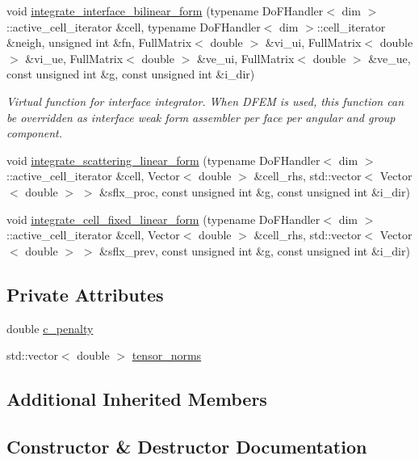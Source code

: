\begin{DoxyCompactItemize}
void \hyperlink{class_even_parity_a0a6674c14f34f22c8ff383aee81ffabf}{integrate\+\_\+interface\+\_\+bilinear\+\_\+form} (typename Do\+F\+Handler$<$ dim $>$\+::active\+\_\+cell\+\_\+iterator \&cell, typename Do\+F\+Handler$<$ dim $>$\+::cell\+\_\+iterator \&neigh, unsigned int \&fn, Full\+Matrix$<$ double $>$ \&vi\+\_\+ui, Full\+Matrix$<$ double $>$ \&vi\+\_\+ue, Full\+Matrix$<$ double $>$ \&ve\+\_\+ui, Full\+Matrix$<$ double $>$ \&ve\+\_\+ue, const unsigned int \&g, const unsigned int \&i\+\_\+dir)
\begin{DoxyCompactList}\small\item\em Virtual function for interface integrator. When D\+F\+EM is used, this function can be overridden as interface weak form assembler per face per angular and group component. \end{DoxyCompactList}\item 
void \hyperlink{class_even_parity_a595082361e618c077877f92d04ebab0b}{integrate\+\_\+scattering\+\_\+linear\+\_\+form} (typename Do\+F\+Handler$<$ dim $>$\+::active\+\_\+cell\+\_\+iterator \&cell, Vector$<$ double $>$ \&cell\+\_\+rhs, std\+::vector$<$ Vector$<$ double $>$ $>$ \&sflx\+\_\+proc, const unsigned int \&g, const unsigned int \&i\+\_\+dir)
\item 
void \hyperlink{class_even_parity_a5efaf943f1bde0b3f9a62ea8f5dc5ff0}{integrate\+\_\+cell\+\_\+fixed\+\_\+linear\+\_\+form} (typename Do\+F\+Handler$<$ dim $>$\+::active\+\_\+cell\+\_\+iterator \&cell, Vector$<$ double $>$ \&cell\+\_\+rhs, std\+::vector$<$ Vector$<$ double $>$ $>$ \&sflx\+\_\+prev, const unsigned int \&g, const unsigned int \&i\+\_\+dir)
\end{DoxyCompactItemize}
\subsection*{Private Attributes}
\begin{DoxyCompactItemize}
\item 
double \hyperlink{class_even_parity_a0eeae2ea4837040ebd8df4a997d82acd}{c\+\_\+penalty}
\item 
std\+::vector$<$ double $>$ \hyperlink{class_even_parity_aca63481c4a5de27e6acc2fc72d802303}{tensor\+\_\+norms}
\end{DoxyCompactItemize}
\subsection*{Additional Inherited Members}


\subsection{Constructor \& Destructor Documentation}
\mbox{\label{class_even_parity_a2877e7e239900be85cc84471fe670abd}} 
